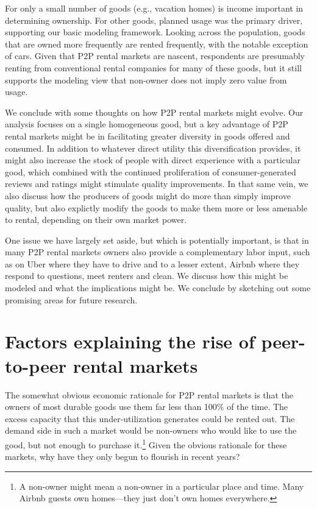 \documentclass[11pt]{article}
\begin{document}
For only a small number of goods (e.g., vacation homes) is income important in determining ownership. 
For other goods, planned usage was the primary driver, supporting our basic modeling framework.  
Looking across the population, goods that are owned more frequently are rented frequently, with the notable exception of cars. 
Given that P2P rental markets are nascent, respondents are presumably renting from conventional rental companies for many of these goods, but it still supports the modeling view that non-owner does not imply zero value from usage. 

We conclude with some thoughts on how P2P rental markets might evolve.
Our analysis focuses on a single homogeneous good, but a key advantage of P2P rental markets might be in facilitating greater diversity in goods offered and consumed. 
In addition to whatever direct utility this diversification provides, it might also increase the stock of people with direct experience with a particular good, which combined with the continued proliferation of consumer-generated reviews and ratings might stimulate quality improvements. 
In that same vein, we also discuss how the producers of goods might do more than simply improve quality, but also explictly modify the goods to make them more or less amenable to rental, depending on their own market power. 

One issue we have largely set aside, but which is potentially important, is that in many P2P rental markets owners also provide a complementary labor input, such as on Uber where they have to drive and to a lesser extent, Airbnb where they respond to questions, meet renters and clean.
We discuss how this might be modeled and what the implications might be. 
We conclude by sketching out some promising areas for future research. 
 
\section{Factors explaining the rise of peer-to-peer rental markets}

The somewhat obvious economic rationale for P2P rental markets is that the owners of most durable goods use them far less than 100\% of the time.
The excess capacity that this under-utilization generates could be rented out.
The demand side in such a market would be non-owners who would like to use the good, but not enough to purchase it.\footnote{
A non-owner might mean a non-owner in a particular place and time. 
Many Airbnb guests own homes---they just don't own homes everywhere. 
} 
Given the obvious rationale for these markets, why have they only begun to flourish in recent years? 
\end{document}
